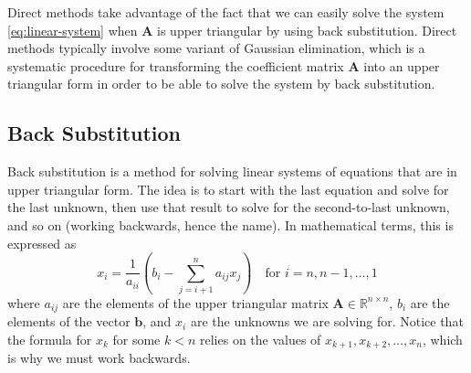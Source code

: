Direct methods take advantage of the fact that we can easily solve the system \autoref{eq:linear-system} when $ \mathbf{A} $ is upper triangular by using back substitution. Direct methods typically involve some variant of Gaussian elimination, which is a systematic procedure for transforming the coefficient matrix $ \mathbf{A} $ into an upper triangular form in order to be able to solve the system by back substitution. 

\subsection{Back Substitution}
Back substitution is a method for solving linear systems of equations that are in upper triangular form. The idea is to start with the last equation and solve for the last unknown, then use that result to solve for the second-to-last unknown, and so on (working backwards, hence the name). In mathematical terms, this is expressed as
\begin{equation*}
    x_i = \frac{1}{a_{ii}} \left( b_i - \sum_{j=i+1}^{n} a_{ij} x_j \right) \quad \text{for } i = n, n-1, \dots, 1
\end{equation*}
where $ a_{ij} $ are the elements of the upper triangular matrix $ \mathbf{A} \in \mathbb{R}^{n \times n} $, $ b_i $ are the elements of the vector $ \mathbf{b} $, and $ x_i $ are the unknowns we are solving for. Notice that the formula for $ x_k $ for some $k < n$ relies on the values of $ x_{k+1}, x_{k+2}, \dots, x_n $, which is why we must work backwards.

